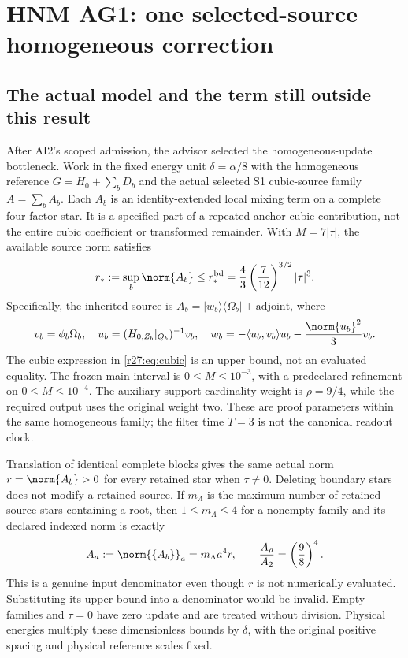 \section{HNM AG1: one selected-source homogeneous correction\workstar}
\subsection{The actual model and the term still outside this result}
After AI2's scoped admission, the advisor selected the homogeneous-update bottleneck. Work in the fixed energy unit $\delta=\alpha/8$ with the homogeneous reference
$G=H_0+\sum_bD_b$ and the actual selected S1 cubic-source family $A=\sum_b A_b$. Each $A_b$ is an identity-extended local mixing term on a complete four-factor star. It is a specified part of a repeated-anchor cubic contribution, not the entire cubic coefficient or transformed remainder. With $M=7|\tau|$, the available source norm satisfies
\begin{equation}
r_*:=\sup_b\norm{A_b}\le r_*^{\rm bd}
=\frac43\left(\frac7{12}\right)^{3/2}|\tau|^3.
\label{r27:eq:cubic}
\end{equation}
Specifically, the inherited source is $A_b=|w_b\rangle\langle\Omega_b|+\mathrm{adjoint}$, where
\begin{equation}
v_b=\phi_b\Omega_b,\quad u_b=(H_{0,Z_b}|_{Q_b})^{-1}v_b,\quad
w_b=-\langle u_b,v_b\rangle u_b-\frac{\norm{u_b}^2}{3}v_b.
\label{r27:eq:actualsource}
\end{equation}
The cubic expression in \eqref{r27:eq:cubic} is an upper bound, not an evaluated equality. The frozen main interval is $0\le M\le10^{-3}$, with a predeclared refinement on $0\le M\le10^{-4}$. The auxiliary support-cardinality weight is $\rho=9/4$, while the required output uses the original weight two. These are proof parameters within the same homogeneous family; the filter time $T=3$ is not the canonical readout clock.

Translation of identical complete blocks gives the same actual norm $r=\norm{A_b}>0$ for every retained star when $\tau\ne0$. Deleting boundary stars does not modify a retained source. If $m_\Lambda$ is the maximum number of retained source stars containing a root, then $1\le m_\Lambda\le4$ for a nonempty family and its declared indexed norm is exactly
\begin{equation}
A_a:=\norm{\{A_b\}}_a=m_\Lambda a^4r,\qquad
\frac{A_\rho}{A_2}=\left(\frac98\right)^4.
\label{r27:eq:denominator}
\end{equation}
This is a genuine input denominator even though $r$ is not numerically evaluated. Substituting its upper bound into a denominator would be invalid. Empty families and $\tau=0$ have zero update and are treated without division. Physical energies multiply these dimensionless bounds by $\delta$, with the original positive spacing and physical reference scales fixed.

